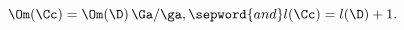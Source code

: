 \begin{equation}
\Om(\Cc) = \Om(\D) \, \Ga/\ga,  \sepword{and}  l(\Cc) = l(\D) + 1.
\label{eq:chain-length}%
\end{equation}

